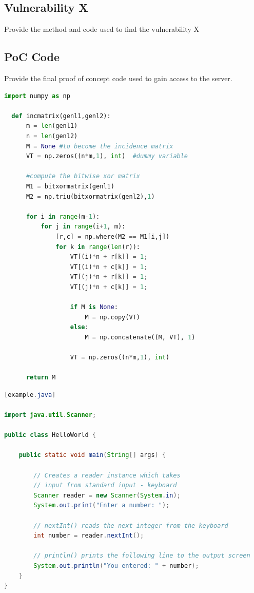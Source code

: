 \documentclass[a4paper]{article}
\begin{document}
\subsection{Vulnerability X}
Provide the method and code used to find the vulnerability X

\subsection{PoC Code}
Provide the final proof of concept code used to gain access to the server.

\begin{lstlisting}[language=Python]
  import numpy as np
      
  def incmatrix(genl1,genl2):
      m = len(genl1)
      n = len(genl2)
      M = None #to become the incidence matrix
      VT = np.zeros((n*m,1), int)  #dummy variable
      
      #compute the bitwise xor matrix
      M1 = bitxormatrix(genl1)
      M2 = np.triu(bitxormatrix(genl2),1) 
  
      for i in range(m-1):
          for j in range(i+1, m):
              [r,c] = np.where(M2 == M1[i,j])
              for k in range(len(r)):
                  VT[(i)*n + r[k]] = 1;
                  VT[(i)*n + c[k]] = 1;
                  VT[(j)*n + r[k]] = 1;
                  VT[(j)*n + c[k]] = 1;
                  
                  if M is None:
                      M = np.copy(VT)
                  else:
                      M = np.concatenate((M, VT), 1)
                  
                  VT = np.zeros((n*m,1), int)
      
      return M
  \end{lstlisting}

\begin{lstlisting}[language=Java][example.java]

import java.util.Scanner;

public class HelloWorld {

    public static void main(String[] args) {

        // Creates a reader instance which takes
        // input from standard input - keyboard
        Scanner reader = new Scanner(System.in);
        System.out.print("Enter a number: ");

        // nextInt() reads the next integer from the keyboard
        int number = reader.nextInt();

        // println() prints the following line to the output screen
        System.out.println("You entered: " + number);
    }
}
\end{lstlisting}
\end{document}

